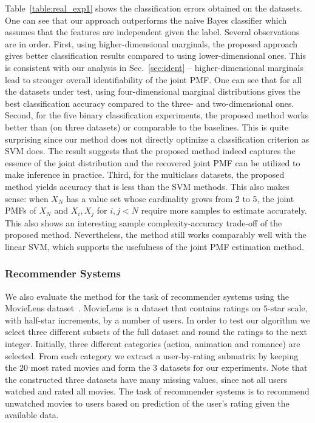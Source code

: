 \documentclass[journal]{IEEEtran}
\begin{document}
Table~\ref{table:real_exp1} shows the classification errors obtained on the datasets. One can see that our approach outperforms the naive Bayes classifier which assumes that the features are independent given the label. 
Several observations are in order.
First, using  {higher-dimensional} marginals, the proposed approach gives better classification results compared to using  {lower-dimensional} ones.
This is consistent with our analysis in Sec.~\ref{sec:ident} --  {higher-dimensional} marginals lead to stronger overall identifiability of the joint PMF. One can see that for all the datasets under test, using  {four-dimensional marginal} distributions gives the best classification accuracy compared to  { the three- and two-dimensional ones}.
Second, for the five binary classification experiments, the proposed method works better than (on three datasets) or comparable to the baselines. This is quite surprising since our method does not directly optimize a classification criterion as SVM does.
The result suggests that the proposed method indeed captures the essence of the joint distribution and the recovered joint PMF can be utilized to make inference in practice.
Third, for the multiclass datasets, the proposed method yields accuracy that is less than the SVM methods. This also makes sense: when $X_N$ has a value set whose cardinality grows from 2 to 5, the joint PMFs of $X_N$ and $X_i,X_j$ for $i,j<N$ require more samples to estimate accurately. This also shows an interesting sample complexity-accuracy trade-off of the proposed method.
Nevertheless, the method still works comparably well with the linear SVM, which supports the usefulness of the joint PMF estimation method.


\subsubsection{Recommender Systems}
We also evaluate the method for the task of recommender systems using the MovieLens dataset~\cite{HaMaKo2015}. MovieLens is a dataset that contains ratings on $5$-star scale, with half-star increments, by a number of users. In order to test our algorithm we select three different subsets of the full dataset and round the ratings to the next integer. Initially, three different categories (action, animation and romance) are selected. From each category we extract a user-by-rating submatrix by keeping the $20$ most rated movies and form the $3$ datasets for our experiments.  
Note that the constructed three datasets have many missing values, since not all users watched and rated all movies. The task of recommender systems is to recommend unwatched movies to users based on prediction of the user's rating given the available data.
\end{document}
